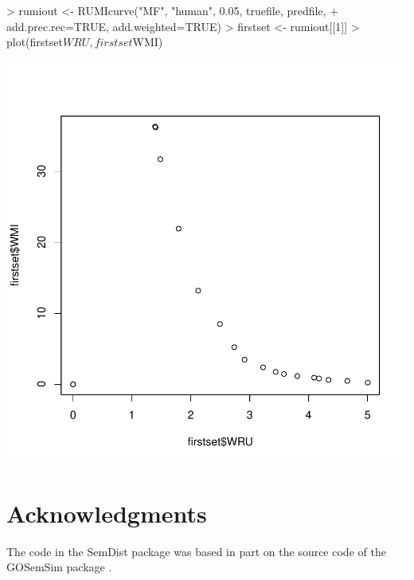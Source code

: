 \documentclass{article}
\begin{document}
\begin{Schunk}
\begin{Sinput}
> rumiout <- RUMIcurve("MF", "human", 0.05, truefile, predfile,
+                      add.prec.rec=TRUE, add.weighted=TRUE)
> firstset <- rumiout[[1]]
> plot(firstset$WRU, firstset$WMI)
\end{Sinput}
\end{Schunk}
\includegraphics{introduction-012}

\section{Acknowledgments}
The code in the SemDist package was based in part on the source code of the GOSemSim package \citep{Yu2010}.


\end{document}
